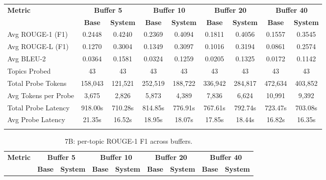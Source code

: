 \documentclass[pdflatex,sn-mathphys-num]{sn-jnl}%
\theoremstyle{thmstyleone}%
\theoremstyle{thmstyletwo}%
\theoremstyle{thmstylethree}%
\begin{document}
\begin{appendices}
\begin{landscape}
\begin{longtable}{@{}p{3.8cm}cccccccc@{}}
\toprule
\textbf{Metric} & \multicolumn{2}{c}{\textbf{Buffer 5}} & \multicolumn{2}{c}{\textbf{Buffer 10}} & \multicolumn{2}{c}{\textbf{Buffer 20}} & \multicolumn{2}{c}{\textbf{Buffer 40}} \\
\cmidrule(lr){2-3}\cmidrule(lr){4-5}\cmidrule(lr){6-7}\cmidrule(lr){8-9}
 & \textbf{Base} & \textbf{System} & \textbf{Base} & \textbf{System} & \textbf{Base} & \textbf{System} & \textbf{Base} & \textbf{System} \\
\midrule
\endhead
Avg ROUGE-1 (F1) & 0.2448 & 0.4240 & 0.2369 & 0.4094 & 0.1811 & 0.4056 & 0.1557 & 0.3545 \\
Avg ROUGE-L (F1) & 0.1270 & 0.3004 & 0.1349 & 0.3097 & 0.1016 & 0.3194 & 0.0861 & 0.2574 \\
Avg BLEU-2 & 0.0364 & 0.1581 & 0.0324 & 0.1259 & 0.0205 & 0.1325 & 0.0172 & 0.1142 \\
Topics Probed & 43 & 43 & 43 & 43 & 43 & 43 & 43 & 43 \\
Total Probe Tokens & 158,043 & 121,521 & 252,519 & 188,722 & 336,942 & 284,817 & 472,634 & 403,852 \\
Avg Tokens per Probe & 3,675 & 2,826 & 5,873 & 4,389 & 7,836 & 6,624 & 10,991 & 9,392 \\
Total Probe Latency & 918.00s & 710.28s & 814.85s & 776.91s & 767.61s & 792.74s & 723.47s & 703.08s \\
Avg Probe Latency & 21.35s & 16.52s & 18.95s & 18.07s & 17.85s & 18.44s & 16.82s & 16.35s \\
\botrule
\end{longtable}
\normalsize
\end{landscape}
\begin{landscape}
\tiny
\begin{longtable}{@{}p{3.8cm}cccccccc@{}}
\caption{7B: per-topic ROUGE-1 F1 across buffers.}\label{tab:app_7b_rouge1_topics}\\

\toprule
\textbf{Metric} & \multicolumn{2}{c}{\textbf{Buffer 5}} & \multicolumn{2}{c}{\textbf{Buffer 10}} & \multicolumn{2}{c}{\textbf{Buffer 20}} & \multicolumn{2}{c}{\textbf{Buffer 40}} \\
\cmidrule(lr){2-3}\cmidrule(lr){4-5}\cmidrule(lr){6-7}\cmidrule(lr){8-9}
 & \textbf{Base} & \textbf{System} & \textbf{Base} & \textbf{System} & \textbf{Base} & \textbf{System} & \textbf{Base} & \textbf{System} \\
\midrule
\endfirsthead


\end{longtable}
\end{landscape}
\end{appendices}
\end{document}
